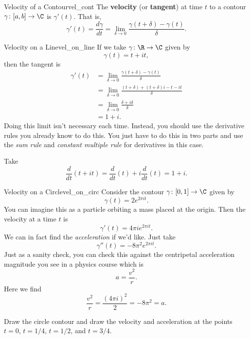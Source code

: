         \begin{df}{Velocity of a Contour}{vel_cont}
        The \textbf{velocity} (or \textbf{tangent}) at time $t$ to a contour $\gamma \colon [a,b] \to \C$ is $\gamma'(t)$. That is,
        \[
        \gamma'(t)=\frac{d\gamma}{dt}=\lim_{\delta\to 0} \frac{\gamma(t+\delta)-\gamma(t)}{\delta}.
        \]
        \end{df}
        
        \begin{ex}{Velocity on a Line}{vel_on_line}
        If we take $\gamma \colon \R \to \C$ given by
        \[
        \gamma(t)=t+it,
        \]
        then the tangent is
        \begin{align*}
        \gamma'(t)&=\lim_{\delta \to 0} \frac{\gamma(t+\delta)-\gamma(t)}{\delta}\\
        &=\lim_{\delta \to 0} \frac{(t+\delta)+(t+\delta)i-t-it}{\delta}\\
        &= \lim_{\delta \to 0} \frac{\delta + i\delta}{\delta}\\
        &= 1+i.
        \end{align*}
        Doing this limit isn't necessary each time.  Instead, you should use the derivative rules you already know to do this.  You just have to do this in two parts and use the \emph{sum rule} and \emph{constant multiple rule} for derivatives in this case. 
        
        Take
        \[
        \frac{d}{dt}(t+it)=\frac{d}{dt}(t)+i\frac{d}{dt}(t)=1+i.
        \]
        \end{ex}
        
        \begin{ex}{Velocity on a Circle}{vel_on_circ}
        Consider the contour $\gamma \colon [0,1] \to \C$ given by
        \[
        \gamma(t)=2e^{2\pi i t}.
        \]
        You can imagine this as a particle orbiting a mass placed at the origin.  Then the velocity at a time $t$ is
        \[
        \gamma'(t)=4\pi i e^{2\pi i t}. 
        \]
        We can in fact find the \emph{acceleration} if we'd like.  Just take
        \[
        \gamma''(t)=-8\pi^2 e^{2\pi i t}.
        \]
        Just as a sanity check, you can check this against the centripetal acceleration magnitude you see in a physics course which is
        \[
        a=\frac{v^2}{r}.
        \]
        Here we find
        \[
        \frac{v^2}{r}=\frac{(4\pi i )^2}{2}=-8\pi^2=a.
        \]
        \end{ex}
        
        \begin{exercise}
        Draw the circle contour and draw the velocity and acceleration at the points $t=0$, $t=1/4$, $t=1/2$, and $t=3/4$. 
        \end{exercise}
        
